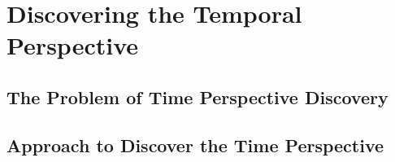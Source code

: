 \chapter{Discovering the Temporal Perspective}


%
%



\section{The Problem of Time Perspective Discovery} \label{sec:bpm2015background}


\section{Approach to Discover the Time Perspective}







